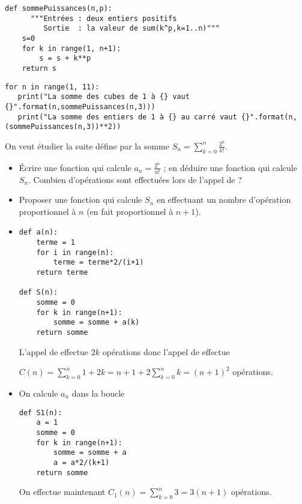 \begin{Answer} 
\begin{lstlisting}
def sommePuissances(n,p):
	  """Entrées : deux entiers positifs
	     Sortie  : la valeur de sum(k^p,k=1..n)"""
    s=0
    for k in range(1, n+1):
        s = s + k**p
    return s
\end{lstlisting}

\begin{lstlisting}
for n in range(1, 11):
   print("La somme des cubes de 1 à {} vaut {}".format(n,sommePuissances(n,3)))
   print("La somme des entiers de 1 à {} au carré vaut {}".format(n,(sommePuissances(n,3))**2))
\end{lstlisting}
\newpage
\end{Answer}
\begin{Exercise}[title= Série]

On veut étudier la suite défine par la somme $\displaystyle S_n=\sum_{k=0}^n \frac{2^k}{k!}$.
\begin{itemize}
    \item Écrire une fonction  qui calcule $a_n=\frac{2^n}{n!}$ ; en déduire une fonction  qui calcule $S_n$. Combien d'opérations sont effectuées lors de l'appel de  ?
    \item Proposer une fonction  qui calcule $S_n$ en effectuant un nombre d'opération proportionnel à $n$ (en fait proportionnel à $n+1$).
\end{itemize}
\end{Exercise}
\begin{Answer} 
\begin{itemize}
\item 
\begin{lstlisting}
def a(n):
    terme = 1
    for i in range(n):
        terme = terme*2/(i+1)
    return terme

def S(n):
    somme = 0
    for k in range(n+1):
        somme = somme + a(k)
    return somme
\end{lstlisting}
L'appel de  effectue $2k$ opérations donc l'appel de  effectue

$\displaystyle C(n) = \sum_{k=0}^n 1+2k = n+1+2\sum_{k=0}^nk=(n+1)^2$ opérations.
\item On calcule $a_n$ dans la boucle
\begin{lstlisting}
def S1(n):
    a = 1
    somme = 0
    for k in range(n+1):
        somme = somme + a
        a = a*2/(k+1)
    return somme
\end{lstlisting}
On effectue maintenant $\displaystyle C_1(n) = \sum_{k=0}^n 3 = 3(n+1)$ opérations.
\end{itemize}
\end{Answer}
